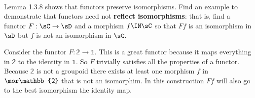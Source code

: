 \documentclass[main.tex]{subfiles}
\begin{document}
\paragraph{}
\begin{exercise}
	Lemma 1.3.8 shows that functors preserve isomorphisms. Find an example to
	demonstrate that functors need not \textbf{reflect isomorphisms}: that is,
	find a functor $ F:\sC\to\sD $ and a morphism $ f\IN\sC $ so that $ Ff $ is
	an isomorphism in $ \sD $ but $ f $ is not an isomorphism in $ \sC. $
\end{exercise}


Consider the functor $ F: \mathbb{2}\to \mathbb{1}.$ This is a great functor
because it maps everything in $\mathbb{2}$ to the identity in $ \mathbb{1}. $ So
$ F $ trivially satisfies all the properties of a functor. Because $ \mathbb{2}
$ is not a groupoid there exists at least one morphism $ f $ in $\mor \mathbb{2}
$ that is not an isomorphim. In this construction $ Ff $ will also go to the
best isomorphism the identity map.
\end{document}
